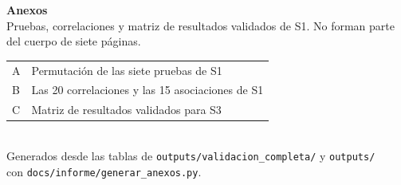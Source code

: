 \documentclass[11pt,a4paper]{article}
\newcommand{\codigo}[1]{{\small\texttt{#1}}}
\begin{document}
\clearpage
\setcounter{secnumdepth}{0}
\begin{center}\vspace*{5cm}
{\LARGE\bfseries Anexos}\\[0.8cm]
{\normalsize\color{gris}Pruebas, correlaciones y matriz de resultados validados de S1. No forman parte del cuerpo de siete páginas.}\\[1.2cm]
\begin{tabular}{@{}l l@{}}
A & Permutación de las siete pruebas de S1\\
B & Las 20 correlaciones y las 15 asociaciones de S1\\
C & Matriz de resultados validados para S3\\
\end{tabular}\\[1.2cm]
{\small\color{gris}Generados desde las tablas de \codigo{outputs/validacion\_completa/} y \codigo{outputs/}\\ con \codigo{docs/informe/generar\_anexos.py}.}
\end{center}
\clearpage

\end{document}
